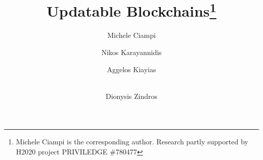 \title{Updatable Blockchains\thanks{Michele Ciampi is the corresponding author. 
Research partly supported by H2020 project PRIVILEDGE \#780477}}



\author{Michele Ciampi 
	\and   Nikos Karayannidis
	\and Aggelos Kiayias 
        \and \\ Dionysis Zindros 
       }


\maketitle




